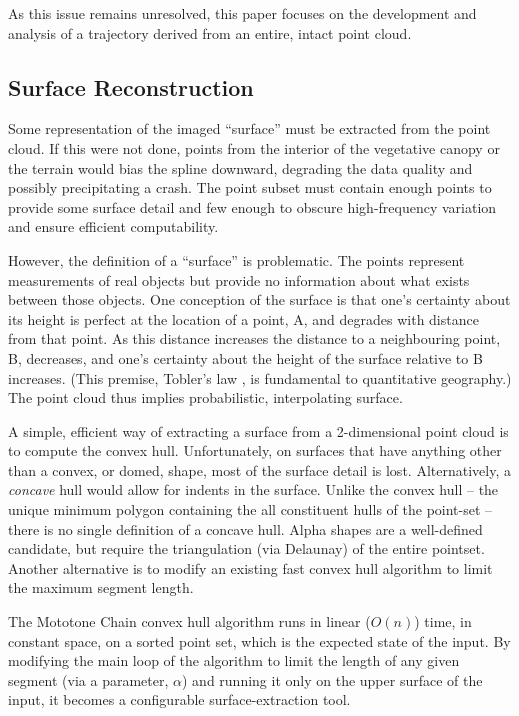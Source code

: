 \documentclass[doc]{apa6}
\begin{document}
As this issue remains unresolved, this paper focuses on the development and analysis of a trajectory derived from an entire, intact point cloud.


\subsection{Surface Reconstruction}

Some representation of the imaged ``surface'' must be extracted from the point cloud. If this were not done, points from the interior of the vegetative canopy or the terrain would bias the spline downward, degrading the data quality and possibly precipitating a crash. The point subset must contain enough points to provide some surface detail and few enough to obscure high-frequency variation and ensure efficient computability. 

However, the definition of a ``surface'' is problematic. The points represent measurements of real objects but provide no information about what exists between those objects. One conception of the surface is that one's  certainty about its height is perfect at the location of a point, A, and degrades with distance from that point. As this distance increases the distance to a neighbouring point, B, decreases, and one's certainty about the height of the surface relative to B increases. (This premise, Tobler's law \parencite{Tobler1970a}, is fundamental to quantitative geography.) The point cloud thus implies probabilistic, interpolating surface. 

A simple, efficient way of extracting a surface from a 2-dimensional point cloud is to compute the convex hull. Unfortunately, on surfaces that have anything other than a convex, or domed, shape, most of the surface detail is lost. Alternatively, a \emph{concave} hull would allow for indents in the surface. Unlike the convex hull -- the unique minimum polygon containing the all constituent hulls of the point-set -- there is no single definition of a concave hull. Alpha shapes \parencite{Edelsbrunner1994} are a well-defined candidate, but require the triangulation (via Delaunay) of the entire pointset. Another alternative is to modify an existing fast convex hull algorithm to limit the maximum segment length.

The Mototone Chain convex hull algorithm \parencite{Andrew1979} runs in linear ($O(n)$) time, in constant space, on a sorted point set, which is the expected state of the input. By modifying the main loop of the algorithm to limit the length of any given segment (via a parameter, $\alpha$) and running it only on the upper surface of the input, it becomes a configurable surface-extraction tool. 
\end{document}
